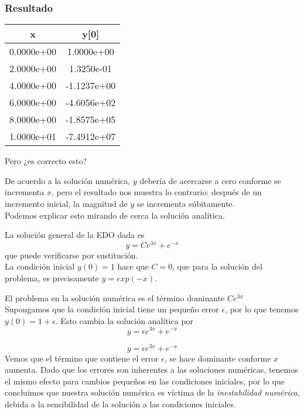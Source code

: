 \begin{frame}
\frametitle{Resultado}
\begin{center}
\begin{tabular}{c | c }
x  &  y[0] \\ \hline 
   0.0000e+00 & 1.0000e+00 \\ \hline
   2.0000e+00 & 1.3250e-01 \\ \hline
   4.0000e+00 & -1.1237e+00 \\ \hline
   6.0000e+00 & -4.6056e+02 \\ \hline
   8.0000e+00 & -1.8575e+05 \\ \hline
   1.0000e+01 & -7.4912e+07
\end{tabular}
\end{center}
Pero ¿es correcto esto?
\end{frame}
\begin{frame}
De acuerdo a la solución numérica, $y$ debería de acercarse a cero conforme se incrementa $x$, pero el resultado nos muestra lo contrario: después de un incremento inicial, la magnitud de $y$ se incrementa súbitamente.
\\
\bigskip
Podemos explicar esto mirando de cerca la solución analítica.
\end{frame}
\begin{frame}
La solución general de la EDO dada es
\[ y = C e^{3x} + e^{-x} \]
que puede verificarse por sustitución.
\\
\medskip
La condición inicial $y(0)=1$ hace que $C=0$, que para la solución del problema, es precisamente $y=exp(-x)$.
\end{frame}
\begin{frame}
El problema en la solución numérica es el término dominante $Ce^{3x}$
\\
\medskip
Supongamos que la condición inicial tiene un pequeño error $\epsilon$, por lo que tenemos $y(0)=1+\epsilon$. Esto cambia la solución analítica por
\[ y = \epsilon e^{3x} + e^{-x} \]
\end{frame}
\begin{frame}
\[ y = \epsilon e^{3x} + e^{-x} \]
Vemos que el término que contiene el error $\epsilon$, se hace dominante conforme $x$ aumenta. Dado que los errores son inherentes a las soluciones numéricas, tenemos el mismo efecto para cambios pequeños en las condiciones iniciales, por lo que concluimos que nuestra solución numérica es víctima de la \emph{inestabilidad numérica}, debida a la sensibilidad de la solución a las condiciones iniciales.
\end{frame}
